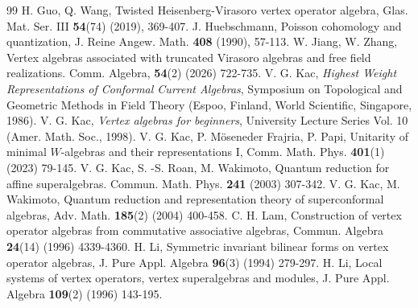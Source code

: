\documentclass[12pt]{article}
\numberwithin{equation}{section}
\theoremstyle{definition}
\theoremstyle{plain}
\begin{document}
\begin{thebibliography}{99}
H. Guo, Q. Wang, Twisted Heisenberg-Virasoro vertex operator algebra, Glas. Mat. Ser. III \textbf{54}(74) (2019), 369-407.
J. Huebschmann, Poisson cohomology and quantization, J. Reine Angew. Math. \textbf{408} (1990), 57-113.
W. Jiang, W. Zhang, Vertex algebras associated with truncated Virasoro algebras and free field realizations. Comm. Algebra, \textbf{54}(2) (2026) 722-735. 
V. G. Kac, \textit{Highest Weight Representations of Conformal Current Algebras}, Symposium on Topological and Geometric Methods in Field Theory (Espoo, Finland, World Scientific, Singapore, 1986).
V. G. Kac, \textit{Vertex algebras for beginners}, University Lecture Series Vol. 10 (Amer. Math. Soc., 1998).
V. G. Kac, P. M\"oseneder Frajria, P. Papi, Unitarity of minimal $W$-algebras and their representations I, Comm. Math. Phys. \textbf{401}(1) (2023) 79-145.
V. G. Kac, S. -S. Roan, M. Wakimoto, Quantum reduction for affine superalgebras. Commun. Math. Phys. \textbf{241} (2003) 307-342.
V. G. Kac, M. Wakimoto, Quantum reduction and representation theory of superconformal algebras, Adv. Math. \textbf{185}(2) (2004) 400-458.
C. H. Lam, Construction of vertex operator algebras from commutative associative algebras, Commun. Algebra \textbf{24}(14) (1996) 4339-4360.
H. Li, Symmetric invariant bilinear forms on vertex operator algebras, J. Pure Appl. Algebra \textbf{96}(3) (1994) 279-297.
H. Li, Local systems of vertex operators, vertex superalgebras and modules, J. Pure Appl. Algebra \textbf{109}(2) (1996) 143-195.


\end{thebibliography}
\end{document}
